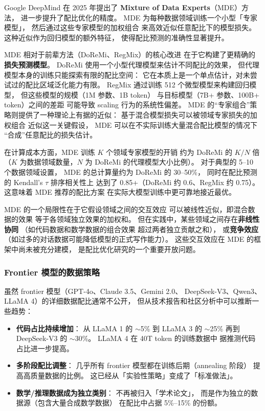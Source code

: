 Google DeepMind 在 2025 年提出了
\textbf{Mixture of Data Experts}（MDE）方法，
进一步提升了配比优化的精度。
MDE 为每种数据领域训练一个小型「专家模型」，
然后通过这些专家模型的加权组合
来高效近似任意配比下的模型损失。
这种近似作为回归模型的额外特征，
使得配比预测的准确性显著提升。

MDE 相对于前辈方法（DoReMi、RegMix）的核心改进
在于它构建了更精确的\textbf{损失预测模型}。
DoReMi 使用一个小型代理模型来估计不同配比的效果，
但代理模型本身的训练只能探索有限的配比空间：
它在本质上是一个单点估计，对未尝试过的配比区域泛化能力有限。
RegMix 通过训练 512 个微型模型来构建回归模型，
但这些模型的规模（1M 参数、1B token）
与目标模型（7B+ 参数、100B+ token）之间的差距
可能导致 scaling 行为的系统性偏差。
MDE 的“专家组合”策略则提供了一种理论上有据的近似：
基于混合模型损失可以被领域专家损失的加权组合
近似这一关键假设，
MDE 可以在不实际训练大量混合配比模型的情况下
“合成”任意配比的损失估计。

在计算成本方面，MDE 训练 $K$ 个领域专家模型的开销
约为 DoReMi 的 $K/N$ 倍
（$K$ 为数据领域数量，$N$ 为 DoReMi 的代理模型大小比例）。
对于典型的 5--10 个数据领域设置，
MDE 的总计算量约为 DoReMi 的 30--50\%，
同时在配比预测的 Kendall's $\tau$ 排序相关性上
达到了 0.85+（DoReMi 约 0.6、RegMix 约 0.75）。
这意味着 MDE 推荐的配比方案
在实际大模型训练中更可靠地接近最优。

MDE 的一个局限性在于它假设领域之间的交互效应
可以被线性近似，即混合数据的效果
等于各领域独立效果的加权和。
但在实践中，某些领域之间存在\textbf{非线性协同}
（如代码数据和数学数据的组合效果
超过两者独立贡献之和），
或\textbf{竞争效应}
（如过多的对话数据可能降低模型的正式写作能力）。
这些交互效应在 MDE 的框架中尚未被充分建模，
是配比优化研究的一个重要开放问题。

\subsubsection{Frontier 模型的数据策略}

虽然 frontier 模型（GPT-4o、Claude 3.5、Gemini 2.0、
DeepSeek-V3、Qwen3、LLaMA 4）的详细数据配比通常不公开，
但从技术报告和社区分析中可以推断一些趋势：

\begin{itemize}[noitemsep]
  \item \textbf{代码占比持续增加}：
        从 LLaMA 1 的 $\sim$5\% 到 LLaMA 3 的 $\sim$25\%
        再到 DeepSeek-V3 的 $\sim$30\%。
        LLaMA 4 在 40T token 的训练数据中
        据推测代码占比进一步提高。
  \item \textbf{多阶段配比调整}：
        几乎所有 frontier 模型都在训练后期（annealing 阶段）
        提高高质量数据的比例。
        这已经从「实验性策略」变成了「标准做法」。
  \item \textbf{数学/推理数据成为独立类别}：
        不再被归入「学术论文」，
        而是作为独立的数据源（包含大量合成数学数据）
        在配比中占据 5\%--15\% 的份额。
\end{itemize}

